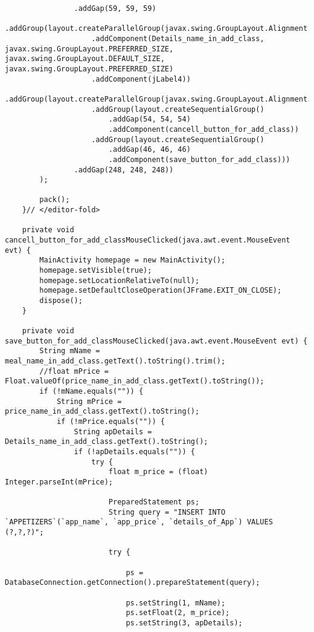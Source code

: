 \documentclass[12pt,a4paper]{article}
\begin{document}
\begin{lstlisting}
                .addGap(59, 59, 59)
                .addGroup(layout.createParallelGroup(javax.swing.GroupLayout.Alignment.LEADING)
                    .addComponent(Details_name_in_add_class, javax.swing.GroupLayout.PREFERRED_SIZE, javax.swing.GroupLayout.DEFAULT_SIZE, javax.swing.GroupLayout.PREFERRED_SIZE)
                    .addComponent(jLabel4))
                .addGroup(layout.createParallelGroup(javax.swing.GroupLayout.Alignment.LEADING)
                    .addGroup(layout.createSequentialGroup()
                        .addGap(54, 54, 54)
                        .addComponent(cancell_button_for_add_class))
                    .addGroup(layout.createSequentialGroup()
                        .addGap(46, 46, 46)
                        .addComponent(save_button_for_add_class)))
                .addGap(248, 248, 248))
        );

        pack();
    }// </editor-fold>                        

    private void cancell_button_for_add_classMouseClicked(java.awt.event.MouseEvent evt) {                                                          
        MainActivity homepage = new MainActivity();
        homepage.setVisible(true);
        homepage.setLocationRelativeTo(null);
        homepage.setDefaultCloseOperation(JFrame.EXIT_ON_CLOSE);
        dispose();
    }                                                         

    private void save_button_for_add_classMouseClicked(java.awt.event.MouseEvent evt) {                                                       
        String mName = meal_name_in_add_class.getText().toString().trim();
        //float mPrice = Float.valueOf(price_name_in_add_class.getText().toString());
        if (!mName.equals("")) {
            String mPrice = price_name_in_add_class.getText().toString();
            if (!mPrice.equals("")) {
                String apDetails = Details_name_in_add_class.getText().toString();
                if (!apDetails.equals("")) {
                    try {
                        float m_price = (float) Integer.parseInt(mPrice);

                        PreparedStatement ps;
                        String query = "INSERT INTO `APPETIZERS`(`app_name`, `app_price`, `details_of_App`) VALUES (?,?,?)";

                        try {

                            ps = DatabaseConnection.getConnection().prepareStatement(query);

                            ps.setString(1, mName);
                            ps.setFloat(2, m_price);
                            ps.setString(3, apDetails);


\end{lstlisting}
\end{document}
